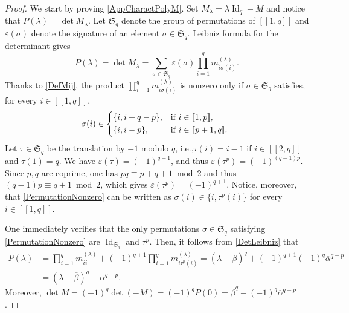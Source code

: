 \documentclass[10pt]{article}
\newcommand{\ie}{i.e.,\xspace}
\let\epsilon\varepsilon
\newcommand{\llbracket}{[\![}
\newcommand{\rrbracket}{]\!]}
\theoremstyle{plain}
\theoremstyle{definition}
\DeclareMathOperator{\id}{Id}
\numberwithin{equation}{section}\numberwithin{figure}{section}\emergencystretch=3em
\begin{document}
\begin{proof}
We start by proving \eqref{AppCharactPolyM}. Set $M_\lambda = \lambda \id_q - M$ and notice that $P(\lambda) = \det M_\lambda$. Let $\mathfrak S_q$ denote the group of permutations of $\llbracket 1, q\rrbracket$ and $\epsilon(\sigma)$ denote the signature of an element $\sigma \in \mathfrak S_q$. Leibniz formula for the determinant gives
\begin{equation}
\label{DetLeibniz}
P(\lambda) = \det M_\lambda = \sum_{\sigma \in \mathfrak S_q} \epsilon(\sigma) \prod_{i=1}^q m_{i \sigma(i)}^{(\lambda)}.
\end{equation}
Thanks to \eqref{DefMij}, the product $\prod_{i=1}^q m_{i \sigma(i)}^{(\lambda)}$ is nonzero only if $\sigma \in \mathfrak S_q$ satisfies, for every $i \in \llbracket 1, q\rrbracket$,
\begin{equation}
\label{PermutationNonzero}
\sigma(i) \in
\begin{dcases*}
\{i, i + q - p\}, & if $i \in \llbracket 1, p\rrbracket$, \\
\{i, i - p\}, & if $i \in \llbracket p+1, q\rrbracket$.
\end{dcases*}
\end{equation}
Let $\tau \in \mathfrak S_q$ be the translation by $-1$ modulo $q$, \ie $\tau(i) = i - 1$ if $i \in \llbracket 2, q\rrbracket$ and $\tau(1) = q$. We have $\epsilon(\tau) = (-1)^{q-1}$, and thus $\epsilon(\tau^p) = (-1)^{(q-1)p}$. Since $p, q$ are coprime, one has $pq \equiv p + q + 1 \bmod 2$ and thus $(q-1)p \equiv q+1 \bmod 2$, which gives $\epsilon(\tau^p) = (-1)^{q+1}$. Notice, moreover, that \eqref{PermutationNonzero} can be written as $\sigma(i) \in \{i, \tau^p(i)\}$ for every $i \in \llbracket 1, q\rrbracket$.

One immediately verifies that the only permutations $\sigma \in \mathfrak S_q$ satisfying \eqref{PermutationNonzero} are $\id_{\mathfrak S_q}$ and $\tau^p$. Then, it follows from \eqref{DetLeibniz} that
\begin{align*}
P(\lambda) &= \prod_{i=1}^q m_{ii}^{(\lambda)} + (-1)^{q+1} \prod_{i=1}^q m_{i \tau^p(i)}^{(\lambda)} = \left(\lambda - \overline\beta\right)^q + (-1)^{q+1} (-1)^q \overline\alpha^{q - p}\\
& = \left(\lambda - \overline\beta\right)^q - \overline\alpha^{q - p}.
\end{align*}
Moreover, $\det M = (-1)^q \det(-M) = (-1)^q P(0) = \overline\beta^q - (-1)^q \overline\alpha^{q - p}$.


\end{proof}
\end{document}
